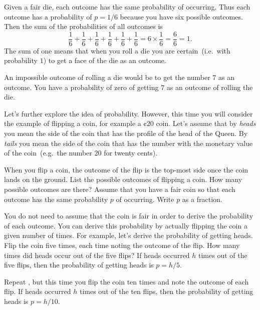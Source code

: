 \documentclass[a4paper,oneside,12pt]{article}
\begin{document}
\begin{problem}
{\begin{solution}
Given a fair die, each outcome has the same probability of occurring.
Thus each outcome has a probability of $p = 1/6$ because you have six
possible outcomes.  Then the sum of the probabilities of all outcomes
is
\[
\frac{1}{6} + \frac{1}{6} + \frac{1}{6}
+
\frac{1}{6} + \frac{1}{6} + \frac{1}{6}
=
6 \times \frac{1}{6}
=
\frac{6}{6}
=
1.
\]
The sum of one means that when you roll a die you are
certain~(i.e.~with probability $1$) to get a face of the die as an
outcome.

An impossible outcome of rolling a die would be to get the number $7$
as an outcome.  You have a probability of zero of getting $7$ as an
outcome of rolling the die.
\end{solution}
}{}

\item Let's further explore the idea of probability.  However, this
  time you will consider the example of flipping a coin, for example a
  $\cent{20}$ coin.  Let's assume that by \emph{heads} you mean the
  side of the coin that has the profile of the head of the Queen.  By
  \emph{tails} you mean the side of the coin that has the number with
  the monetary value of the coin~(e.g.~the number $20$ for twenty
  cents).
  \begin{packedenum}
  \item\label{subprob:flip_coin_possible_outcomes}
    When you flip a coin, the outcome of the flip is the top-most side
    once the coin lands on the ground.  List the possible outcomes of
    flipping a coin.  How many possible outcomes are there?  Assume
    that you have a fair coin so that each outcome has the same
    probability $p$ of occurring.  Write $p$ as a fraction.

  \item\label{subprob:flip_coin_empirical_probability_5}
    You do not need to assume that the coin is fair in order to derive
    the probability of each outcome.  You can derive this probability
    by actually flipping the coin a given number of times.  For
    example, let's derive the probability of getting heads.  Flip the
    coin five times, each time noting the outcome of the flip.  How
    many times did heads occur out of the five flips?  If heads
    occurred $h$ times out of the five flips, then the probability of
    getting heads is $p = h / 5$.

  \item\label{subprob:flip_coin_empirical_probability_10}
    Repeat , but this
    time you flip the coin ten times and note the outcome of each
    flip.  If heads occurred $h$ times out of the ten flips, then the
    probability of getting heads is $p = h / 10$.


\end{packedenum}
\end{problem}
\end{document}
